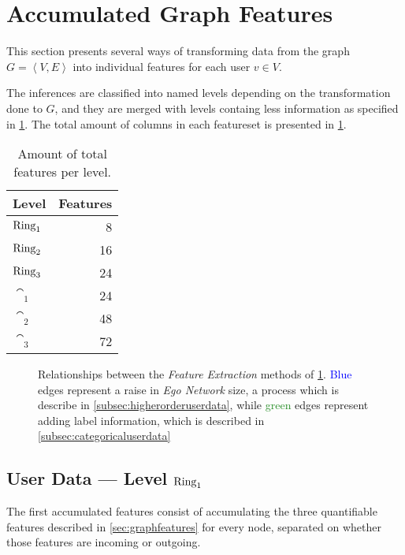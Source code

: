\section{Accumulated Graph Features}
\label{sec:accumulatedfeatures}

This section presents several ways of transforming data from the graph $G = \left< V, E \right>$ into individual features for each user $v \in V$.

The inferences are classified into named levels depending on the transformation done to $G$, and they are merged with levels containg less information as specified in \cref{fig:mlrelationships}. The total amount of columns in each featureset is presented in \cref{tab:features}.

\begin{table}
\centering
\begin{tabular}{>{\bfseries}l r}
\toprule
Level & Features \\
\midrule
$\operatorname{Ring}_1$ & \num{8}  \\
$\operatorname{Ring}_2$ & \num{16} \\
$\operatorname{Ring}_3$ & \num{24} \\
$\cat_1$ & \num{24} \\
$\cat_2$ & \num{48} \\
$\cat_3$ & \num{72} \\
\bottomrule
\end{tabular}
\caption{Amount of total features per level.}
\label{tab:features}
\end{table}

\begin{figure}
\centering
\resizebox{!}{.2\textheight}{%
	\framebox{%
		
	}
}
\caption{Relationships between the \emph{Feature Extraction} methods of \cref{sec:accumulatedfeatures}. \textcolor{Blue}{Blue} edges represent a raise in \emph{Ego Network} size, a process which is describe in \cref{subsec:higherorderuserdata}, while \textcolor{ForestGreen}{green} edges represent adding label information, which is described in \cref{subsec:categoricaluserdata}}
\label{fig:mlrelationships}
\end{figure}

\subsection{User Data --- Level $\operatorname{Ring}_1$}
\label{subsec:user_data}

The first accumulated features consist of accumulating the three quantifiable features described in \cref{sec:graphfeatures} for every node, separated on whether those features are incoming or outgoing.

